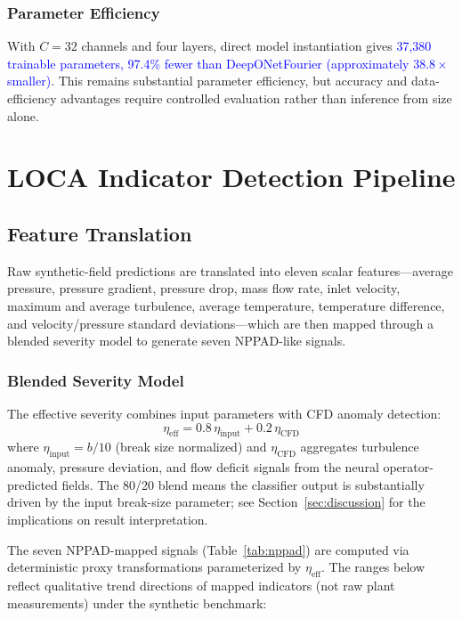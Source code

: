 \documentclass[journal]{IEEEtran}
\newcommand{\added}[1]{\textcolor{blue}{#1}}
\begin{document}
\subsubsection{Parameter Efficiency}
With $C=32$ channels and four layers, direct model instantiation gives \added{37,380 trainable parameters, 97.4\% fewer than DeepONetFourier (approximately $38.8\times$ smaller)}. This remains substantial parameter efficiency, but accuracy and data-efficiency advantages require controlled evaluation rather than inference from size alone.

\section{LOCA Indicator Detection Pipeline}
\label{sec:pipeline}

\subsection{Feature Translation}

Raw synthetic-field predictions are translated into eleven scalar features---average pressure, pressure gradient, pressure drop, mass flow rate, inlet velocity, maximum and average turbulence, average temperature, temperature difference, and velocity/pressure standard deviations---which are then mapped through a blended severity model to generate seven NPPAD-like signals.

\subsubsection{Blended Severity Model}
The effective severity combines input parameters with CFD anomaly detection:
\begin{equation}
\eta_\text{eff} = 0.8\,\eta_\text{input} + 0.2\,\eta_\text{CFD}
\label{eq:severity}
\end{equation}
where $\eta_\text{input} = b/10$ (break size normalized) and $\eta_\text{CFD}$ aggregates turbulence anomaly, pressure deviation, and flow deficit signals from the neural operator-predicted fields. The 80/20 blend means the classifier output is substantially driven by the input break-size parameter; see Section~\ref{sec:discussion} for the implications on result interpretation.

The seven NPPAD-mapped signals (Table~\ref{tab:nppad}) are computed via deterministic proxy transformations parameterized by $\eta_\text{eff}$. The ranges below reflect qualitative trend directions of mapped indicators (not raw plant measurements) under the synthetic benchmark:
\end{document}
